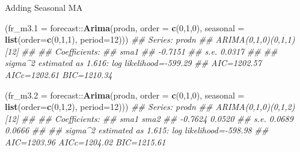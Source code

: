 \documentclass[11pt,ignorenonframetext,]{beamer}
\newenvironment{Shaded}{}{}
\newcommand{\CommentTok}[1]{\textcolor[rgb]{0.38,0.63,0.69}{\textit{#1}}}
\newcommand{\DataTypeTok}[1]{\textcolor[rgb]{0.56,0.13,0.00}{#1}}
\newcommand{\DecValTok}[1]{\textcolor[rgb]{0.25,0.63,0.44}{#1}}
\newcommand{\KeywordTok}[1]{\textcolor[rgb]{0.00,0.44,0.13}{\textbf{#1}}}
\newcommand{\NormalTok}[1]{#1}
\newcommand{\OperatorTok}[1]{\textcolor[rgb]{0.40,0.40,0.40}{#1}}
\let\oldShaded\Shaded
\let\endoldShaded\endShaded
\renewenvironment{Shaded}{\footnotesize\begin{spacing}{0.9}\oldShaded}{\endoldShaded\end{spacing}}
\let\oldverbatim\verbatim
\let\endoldverbatim\endverbatim
\newcommand{\scriptoutput}{
  \renewenvironment{Shaded}{\scriptsize\begin{spacing}{0.9}\oldShaded}{\endoldShaded\end{spacing}}
  \renewenvironment{verbatim}{\scriptsize\begin{spacing}{0.9}\oldverbatim}{\endoldverbatim\end{spacing}}
}
\begin{document}
\begin{frame}[fragile]{Adding Seasonal MA}
\protect\hypertarget{adding-seasonal-ma}{}

\scriptoutput

\begin{Shaded}
\begin{Highlighting}[]
\NormalTok{(}\DataTypeTok{fr_m3.1 =}\NormalTok{ forecast}\OperatorTok{::}\KeywordTok{Arima}\NormalTok{(prodn, }\DataTypeTok{order =} \KeywordTok{c}\NormalTok{(}\DecValTok{0}\NormalTok{,}\DecValTok{1}\NormalTok{,}\DecValTok{0}\NormalTok{), }
            \DataTypeTok{seasonal =} \KeywordTok{list}\NormalTok{(}\DataTypeTok{order=}\KeywordTok{c}\NormalTok{(}\DecValTok{0}\NormalTok{,}\DecValTok{1}\NormalTok{,}\DecValTok{1}\NormalTok{), }\DataTypeTok{period=}\DecValTok{12}\NormalTok{)))}
\CommentTok{## Series: prodn }
\CommentTok{## ARIMA(0,1,0)(0,1,1)[12] }
\CommentTok{## }
\CommentTok{## Coefficients:}
\CommentTok{##          sma1}
\CommentTok{##       -0.7151}
\CommentTok{## s.e.   0.0317}
\CommentTok{## }
\CommentTok{## sigma^2 estimated as 1.616:  log likelihood=-599.29}
\CommentTok{## AIC=1202.57   AICc=1202.61   BIC=1210.34}
\end{Highlighting}
\end{Shaded}

\begin{Shaded}
\begin{Highlighting}[]
\NormalTok{(}\DataTypeTok{fr_m3.2 =}\NormalTok{ forecast}\OperatorTok{::}\KeywordTok{Arima}\NormalTok{(prodn, }\DataTypeTok{order =} \KeywordTok{c}\NormalTok{(}\DecValTok{0}\NormalTok{,}\DecValTok{1}\NormalTok{,}\DecValTok{0}\NormalTok{), }
            \DataTypeTok{seasonal =} \KeywordTok{list}\NormalTok{(}\DataTypeTok{order=}\KeywordTok{c}\NormalTok{(}\DecValTok{0}\NormalTok{,}\DecValTok{1}\NormalTok{,}\DecValTok{2}\NormalTok{), }\DataTypeTok{period=}\DecValTok{12}\NormalTok{)))}
\CommentTok{## Series: prodn }
\CommentTok{## ARIMA(0,1,0)(0,1,2)[12] }
\CommentTok{## }
\CommentTok{## Coefficients:}
\CommentTok{##          sma1    sma2}
\CommentTok{##       -0.7624  0.0520}
\CommentTok{## s.e.   0.0689  0.0666}
\CommentTok{## }
\CommentTok{## sigma^2 estimated as 1.615:  log likelihood=-598.98}
\CommentTok{## AIC=1203.96   AICc=1204.02   BIC=1215.61}
\end{Highlighting}
\end{Shaded}

\end{frame}
\end{document}

